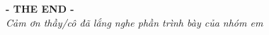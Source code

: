 \documentclass[aspectratio=169]{beamer}
\begin{document}







\begin{frame}
    \centering
    \vspace{0.5cm}
    \textbf{\Huge{- THE END - }}\\
    \vspace{0.2cm}
    \textit{\Large{Cảm ơn thầy/cô đã lắng nghe phần trình bày của nhóm em}}\\
    \vspace{15pt}
\end{frame}
\end{document}
